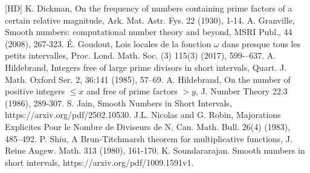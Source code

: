 \documentclass{amsart}
\begin{document}

%
\begin{thebibliography}{[HD]}
\normalsize
{} K. Dickman, On the frequency of numbers containing prime factors
of a certain relative magnitude, Ark. Mat. Astr. Fys. 22 (1930), 1-14.
 A. Granville, Smooth numbers: computational number theory and beyond, MSRI Publ., 44 (2008), 267-323.
  \'{E}. Goudout, Lois locales de la fonction $\omega$ dans presque tous les petits intervalles, Proc. Lond. Math. Soc. (3) 115(3) (2017), 599-–637.
 A. Hildebrand, Integers free of large prime divisors in short
intervals, Quart. J. Math. Oxford Ser. 2, 36:141 (1985), 57–69.
  A. Hildebrand, On the number of positive integers $\leq x$ and free of prime factors $>y$, J. Number Theory 22:3 (1986), 289-307.
 S. Jain, Smooth Numbers in Short Intervals, https://arxiv.org/pdf/2502.10530.
 J.L. Nicolas and G. Robin, Majorations Explicites Pour le Nombre de Diviseurs de N, Can. Math. Bull. 26(4) (1983), 485--492.
 P. Shiu, A Brun-Titchmarsh theorem for multiplicative functions, J. Reine Angew. Math. 313
(1980), 161-170.
  K. Soundararajan. Smooth numbers in short intervals, https://arxiv.org/pdf/1009.1591v1.
\end{thebibliography}
\end{document}
